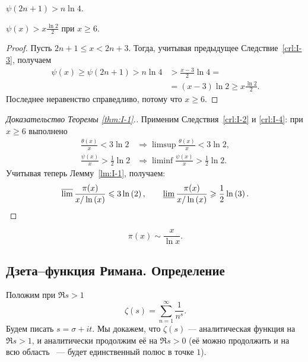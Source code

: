 \begin{ncorollary}
\label{crl:I-3}
    $\psi(2n + 1) > n\ln{4}$.
\end{ncorollary}

\begin{ncorollary}
\label{crl:I-4}
    $\psi(x) > x \frac{\ln{2}}{2}$ при $x \ge 6$.
\end{ncorollary}
\begin{proof}
    Пусть $2n + 1 \le x < 2n + 3$. Тогда, учитывая предыдущее Следствие~\ref{crl:I-3}, получаем
    \begin{align*}
        \psi(x) \ge \psi(2n+1) > n \ln{4} &> \frac{x - 3}{2} \ln{4} = \\
        & = (x-3) \ln{2} \ge x \frac{\ln{2}}{2}.
    \end{align*}
    Последнее неравенство справедливо, потому что $x \ge 6$.
\end{proof}

\begin{proof}[Доказательство Теоремы \ref{thm:I-1}.]
    Применим Следствия~\ref{crl:I-2} и \ref{crl:I-4}: при $x \ge 6$ выполнено
    \begin{align*}
        \frac{\theta(x)}{x} < 3\ln{2} &\Rightarrow \limsup{\frac{\theta(x)}{x}} < 3\ln{2}, \\
        \frac{\psi(x)}{x} > \frac{1}{2}\ln{2} &\Rightarrow \liminf{\frac{\psi(x)}{x}} > \frac{1}{2}\ln{2}. 
    \end{align*}
    Учитывая теперь Лемму~\ref{lm:I-1}, получаем:
    \[
        \varlimsup{\frac{\pi(x)}{\ensuremath{x / \operatorname{ln}\left( x \right)}}} \leqslant 3\operatorname{ln}\left( 2 \right),
        \qquad
        \varliminf{\frac{\pi(x)}{\ensuremath{x / \operatorname{ln}\left( x \right)}}} \geqslant \frac{1}{2}\operatorname{ln}\left( 3 \right).
    \]
\end{proof}

\begin{theorem}
    \[
        \pi(x) \sim \frac{x}{\ln{x}}.
    \]
\end{theorem}


\subsection{Дзета--функция Римана. Определение}
\label{subsec:2_Riemann-zeta-function-definition}

\begin{ndefinition}
\label{I_Riemann-zeta-function}
    Положим при $\Re{s} > 1$
    \[
        \zeta(s) = \sum_{n=1}^\infty \frac{1}{n^s}.
    \]
    Будем писать $s = \sigma + it$. Мы докажем, что $\zeta(s)$ --- аналитическая функция на ${\Re{s} > 1}$, и аналитически продолжим её на $\Re{s} > 0$ (её можно продолжить и на всю область \CC~--- будет единственный полюс в точке $1$).
\end{ndefinition}

